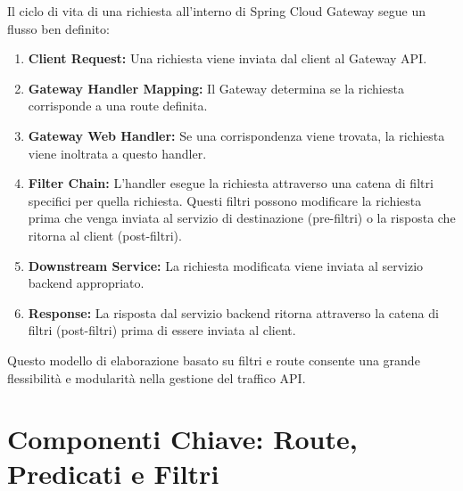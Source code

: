 Il ciclo di vita di una richiesta all'interno di Spring Cloud Gateway segue un flusso ben definito:
\begin{enumerate}[label=\arabic*.]
    \item \textbf{Client Request:} Una richiesta viene inviata dal client al Gateway API.
    \item \textbf{Gateway Handler Mapping:} Il Gateway determina se la richiesta corrisponde a una route definita.
    \item \textbf{Gateway Web Handler:} Se una corrispondenza viene trovata, la richiesta viene inoltrata a questo handler.
    \item \textbf{Filter Chain:} L'handler esegue la richiesta attraverso una catena di filtri specifici per quella richiesta. Questi filtri possono modificare la richiesta prima che venga inviata al servizio di destinazione (pre-filtri) o la risposta che ritorna al client (post-filtri).
    \item \textbf{Downstream Service:} La richiesta modificata viene inviata al servizio backend appropriato.
    \item \textbf{Response:} La risposta dal servizio backend ritorna attraverso la catena di filtri (post-filtri) prima di essere inviata al client.
\end{enumerate}
Questo modello di elaborazione basato su filtri e route consente una grande flessibilità e modularità nella gestione del traffico API.

\section{Componenti Chiave: Route, Predicati e Filtri}


